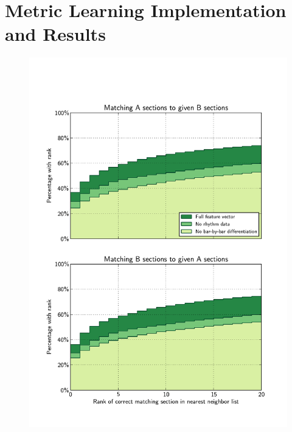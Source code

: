 \documentclass{article} %
\begin{document}
\section{Metric Learning Implementation and Results}
\begin{figure}
  \centering
  \includegraphics[width=5in]{../trial_data_logs/hists.pdf}
\end{figure}
\end{document}
